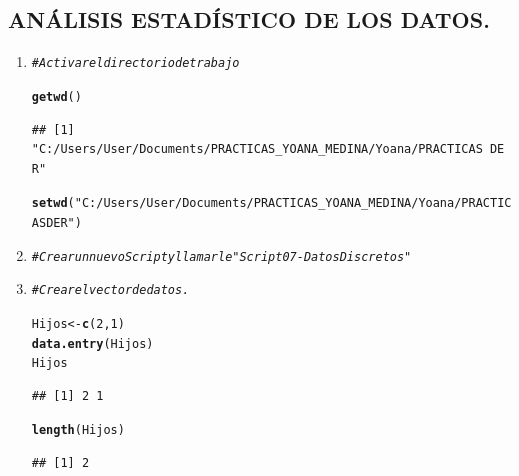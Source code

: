 \documentclass[12pt,letterpaper]{article}\usepackage[]{graphicx}\usepackage[]{color}
\makeatletter
\newcommand{\hlnum}[1]{\textcolor[rgb]{0.686,0.059,0.569}{#1}}%
\newcommand{\hlstr}[1]{\textcolor[rgb]{0.192,0.494,0.8}{#1}}%
\newcommand{\hlcom}[1]{\textcolor[rgb]{0.678,0.584,0.686}{\textit{#1}}}%
\newcommand{\hlstd}[1]{\textcolor[rgb]{0.345,0.345,0.345}{#1}}%
\newcommand{\hlkwb}[1]{\textcolor[rgb]{0.69,0.353,0.396}{#1}}%
\newcommand{\hlkwd}[1]{\textcolor[rgb]{0.737,0.353,0.396}{\textbf{#1}}}%
\newenvironment{kframe}{%
 \def\at@end@of@kframe{}%
 \ifinner\ifhmode%
  \def\at@end@of@kframe{\end{minipage}}%
  \begin{minipage}{\columnwidth}%
 \fi\fi%
 \def\FrameCommand##1{\hskip\@totalleftmargin \hskip-\fboxsep
 \colorbox{shadecolor}{##1}\hskip-\fboxsep
     \hskip-\linewidth \hskip-\@totalleftmargin \hskip\columnwidth}%
 \MakeFramed {\advance\hsize-\width
   \@totalleftmargin\z@ \linewidth\hsize
   \@setminipage}}%
 {\par\unskip\endMakeFramed%
 \at@end@of@kframe}
\newenvironment{knitrout}{}{} %
\makeatother
\begin{document}
\begin{center}
\subsection*{\textbf{AN\'ALISIS ESTAD\'ISTICO DE LOS DATOS.}}
\end{center}

\begin{enumerate}
  \item 

\begin{knitrout}
\color{fgcolor}\begin{kframe}
\begin{alltt}
\hlcom{# Activar el directorio de trabajo }

\hlkwd{getwd}\hlstd{()}
\end{alltt}
\begin{verbatim}
## [1] "C:/Users/User/Documents/PRACTICAS_YOANA_MEDINA/Yoana/PRACTICAS DE R"
\end{verbatim}
\begin{alltt}
\hlkwd{setwd}\hlstd{(}\hlstr{"C:/Users/User/Documents/PRACTICAS_YOANA_MEDINA/Yoana/PRACTICAS DE R"}\hlstd{)}
\end{alltt}
\end{kframe}
\end{knitrout}

\item 
\begin{knitrout}
\color{fgcolor}\begin{kframe}
\begin{alltt}
\hlcom{# Crear un nuevo Script y llamarle "Script07-DatosDiscretos"}
\end{alltt}
\end{kframe}
\end{knitrout}

\item 
\begin{knitrout}
\color{fgcolor}\begin{kframe}
\begin{alltt}
\hlcom{# Crear el vector de datos.}

\hlstd{Hijos} \hlkwb{<-} \hlkwd{c}\hlstd{(}\hlnum{2}\hlstd{,} \hlnum{1}\hlstd{)}
\hlkwd{data.entry}\hlstd{(Hijos)}
\hlstd{Hijos}
\end{alltt}
\begin{verbatim}
## [1] 2 1
\end{verbatim}
\begin{alltt}
\hlkwd{length}\hlstd{(Hijos)}
\end{alltt}
\begin{verbatim}
## [1] 2
\end{verbatim}
\end{kframe}
\end{knitrout}


\end{enumerate}
\end{document}
